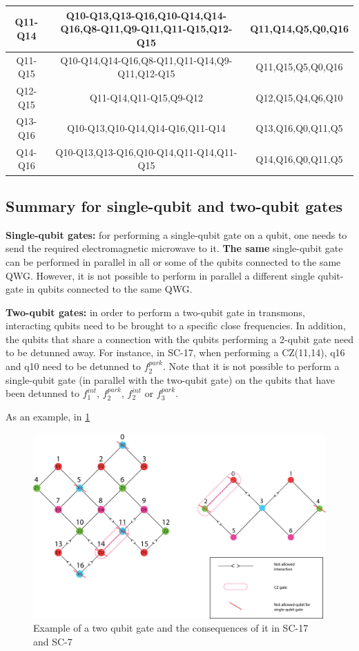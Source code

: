 \documentclass[11pt]{article}
\begin{document}
\begin{table}[h!]
{\begin{tabular}{|c|c|c|}
\hline
Q11-Q14 & Q10-Q13,Q13-Q16,Q10-Q14,Q14-Q16,Q8-Q11,Q9-Q11,Q11-Q15,Q12-Q15 & Q11,Q14,Q5,Q0,Q16\\
\hline
Q11-Q15 & Q10-Q14,Q14-Q16,Q8-Q11,Q11-Q14,Q9-Q11,Q12-Q15 & Q11,Q15,Q5,Q0,Q16\\
\hline
Q12-Q15 & Q11-Q14,Q11-Q15,Q9-Q12 & Q12,Q15,Q4,Q6,Q10\\
\hline
Q13-Q16 & Q10-Q13,Q10-Q14,Q14-Q16,Q11-Q14  & Q13,Q16,Q0,Q11,Q5\\
\hline
Q14-Q16 & Q10-Q13,Q13-Q16,Q10-Q14,Q11-Q14,Q11-Q15 & Q14,Q16,Q0,Q11,Q5\\
\hline
\end{tabular}
}
\end{table}

\subsection{Summary for single-qubit and two-qubit gates}

\textbf{Single-qubit gates:} for performing a single-qubit gate on a qubit, one needs to send the required electromagnetic microwave to it.  \textbf{The same} single-qubit gate can be performed in parallel in all or some of the qubits connected to the same QWG. However, it is not possible to perform in parallel a different single qubit-gate in qubits connected to the same QWG.

\textbf{Two-qubit gates:} in order to perform a two-qubit gate in transmons, interacting qubits need to be brought to a specific close frequencies. In addition, the qubits that share a connection with the qubits performing a 2-qubit gate need to be detunned away. For instance, in SC-17, when performing a CZ(11,14), q16 and q10 need to be detunned to $f_{2}^{park}$. Note that it is not possible to perform a single-qubit gate (in parallel with the two-qubit gate) on the qubits that have been detunned to  $f_{1}^{int}$,  $f_{2}^{park}$, $f_{2}^{int}$ or $f_{3}^{park}$. 

As an example, in \ref{fig:two_qubit_gate_ex}



\begin{figure}[h!]
\centering
\includegraphics[width=\textwidth]{two_qubit_constraint_sc17.png}
\caption{\label{fig:two_qubit_gate_ex}
Example of a two qubit gate and the consequences of it in SC-17 and SC-7}
\end{figure}
\end{document}
